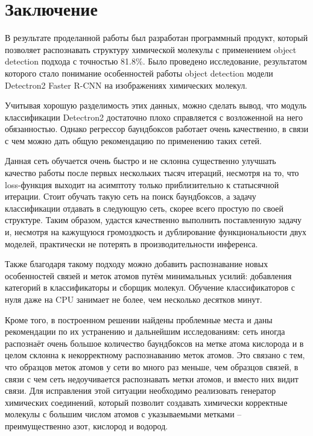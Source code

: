 \chapter*{Заключение} \label{ch-conclusion}

В результате проделанной работы был разработан программный продукт, который позволяет распознавать структуру химической молекулы с применением object detection подхода с точностью 81.8\%. Было проведено исследование, результатом которого стало понимание особенностей работы object detection модели Detectron2 Faster R-CNN на изображениях химических молекул.

Учитывая хорошую разделимость этих данных, можно сделать вывод, что модуль классификации Detectron2 достаточно плохо справляется с возложенной на него обязанностью. Однако регрессор баундбоксов работает очень качественно, в связи с чем можно дать общую рекомендацию по применению таких сетей.

Данная сеть обучается очень быстро и не склонна существенно улучшать качество работы после первых нескольких тысяч итераций, несмотря на то, что loss-функция выходит на асимптоту только приблизительно к статысячной итерации. Стоит обучать такую сеть на поиск баундбоксов, а задачу классификации отдавать в следующую сеть, скорее всего простую по своей структуре. Таким образом, удастся качественно выполнить поставленную задачу и, несмотря на кажущуюся громоздкость и дублирование функциональности двух моделей, практически не потерять в производительности инференса.

Также благодаря такому подходу можно добавить распознавание новых особенностей связей и меток атомов путём минимальных усилий: добавления категорий в классификаторы и сборщик молекул. Обучение классификаторов с нуля даже на CPU занимает не более, чем несколько десятков минут.

Кроме того, в построенном решении найдены проблемные места и даны рекомендации по их устранению и дальнейшим исследованиям: сеть иногда распознаёт очень большое количество баундбоксов на метке атома кислорода и в целом склонна к некорректному распознаванию меток атомов. Это связано с тем, что образцов меток атомов у сети во много раз меньше, чем образцов связей, в связи с чем сеть недоучивается распознавать метки атомов, и вместо них видит связи. Для исправления этой ситуации необходимо реализовать генератор химических соединений, который позволит создавать химически корректные молекулы с большим числом атомов с указываемыми метками -- преимущественно азот, кислород и водород.

